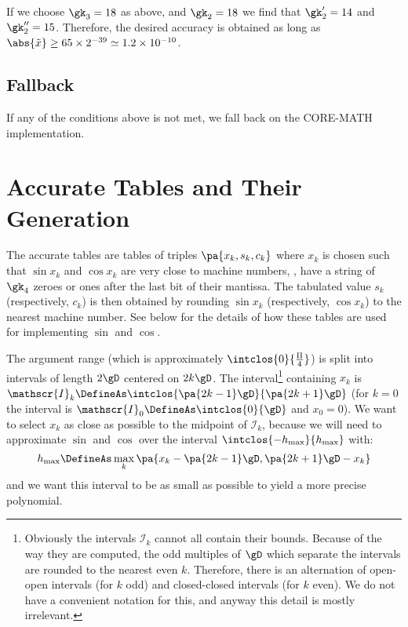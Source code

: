 \documentclass[10pt, a4paper, twoside]{basestyle}
\newcommand{\red}[1]{\tilde{#1}}
\begin{document}
If we choose $\gk_3 = 18$ as above, and $\gk_2 = 18$ we find that $\gk'_2 = 14$ and $\gk''_2 = 15$.  Therefore, the desired accuracy is obtained as long as $\abs{\red x} \geq 65 \times 2^{-39} \simeq 1.2 \times 10^{-10}$.

\subsection*{Fallback}

If any of the conditions above is not met, we fall back on the CORE-MATH implementation.

\section*{Accurate Tables and Their Generation}

The accurate tables are tables of triples $\pa{x_k, s_k, c_k}$ where $x_k$ is chosen such that $\sin x_k$ and $\cos x_k$ are very close to machine numbers, \idest, have a string of $\gk_4$ zeroes or ones after the last bit of their mantissa.  The tabulated value $s_k$ (respectively, $c_k$) is then obtained by rounding $\sin x_k$ (respectively, $\cos x_k$) to the nearest machine number.  See  below for the details of how these tables are used for implementing $\sin$ and $\cos$.

The argument range (which is approximately $\intclos{0}{\frac{\Pi}{4}}$) is split into intervals of length $2 \gD$ centered on $2 k \gD$.  The interval\footnote{Obviously the intervals $\mathscr{I}_k$ cannot all contain their bounds.  Because of the way they are computed, the odd multiples of $\gD$ which separate the intervals are rounded to the nearest even $k$.  Therefore, there is an alternation of open-open intervals (for $k$ odd) and closed-closed intervals (for $k$ even).  We do not have a convenient notation for this, and anyway this detail is mostly irrelevant.} containing $x_k$ is $\mathscr{I}_k \DefineAs \intclos{\pa{2 k - 1}\gD}{\pa{2 k + 1}\gD}$ (for $k = 0$ the interval is $\mathscr{I}_0 \DefineAs \intclos{0}{\gD}$ and $x_0 = 0$).  We want to select $x_k$ as close as possible to the midpoint of $\mathscr{I}_k$, because we will need to approximate $\sin$ and $\cos$ over the interval $\intclos{-h_{\text{max}}}{h_{\text{max}}}$ with:
\[
h_{\text{max}} \DefineAs \max_k \pa{x_k - \pa{2 k - 1} \gD, \pa{2 k + 1} \gD - x_k}
\]
and we want this interval to be as small as possible to yield a more precise polynomial.
\end{document}
